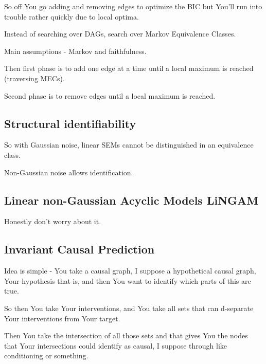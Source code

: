 \documentclass{article}
\begin{document}
		So off You go adding and removing edges to optimize  the BIC but You'll run into trouble rather quickly due to local optima.
		
		Instead of searching over DAGs, search over Markov Equivalence Classes.
		
		Main assumptions - Markov and faithfulness.
		
		Then first phase is to add one edge at a time until a local maximum is reached (traversing MECs).
		
		Second phase is to remove edges until a local maximum is reached.
		
	\subsection{Structural identifiability}
	
		So with Gaussian noise, linear SEMs cannot be distinguished in an equivalence class. 
		
		Non-Gaussian noise allows identification.
		
	\subsection{Linear non-Gaussian Acyclic Models LiNGAM}
	
		Honestly don't worry about it.
		
	\subsection{Invariant Causal Prediction}
	
		Idea is simple - You take a causal graph, I suppose a hypothetical causal graph, Your hypothesis that is, and then You want to identify which parts of this are true.
		
		So then You take Your interventions, and You take all sets that can d-separate Your interventions from Your target.
		
		Then You take the intersection of all those sets and that gives You the nodes that Your intersections could identify as causal, I suppose through like conditioning or something.
		
		
		
		
		
		
		
		
		
		
		
		
		
		
		 
		 
\newpage
\end{document}
